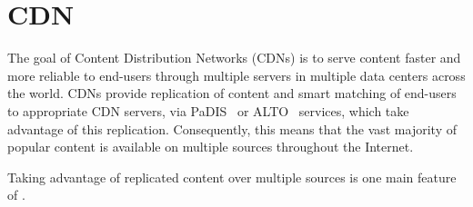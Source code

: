 \section{CDN}
\label{sec:background-cdn}

The goal of Content Distribution Networks (CDNs) is to serve content faster and more reliable to end-users through multiple servers in multiple data centers across the world. 
CDNs provide replication of content and smart matching of end-users to appropriate CDN servers, \eg via PaDIS~\cite{POESE10-ICD} or ALTO~\cite{RFC-ALTO} services, which take advantage of this replication. 
Consequently, this means that the vast majority of popular content is available on multiple sources throughout the Internet. 

Taking advantage of replicated content over multiple sources is one main feature of \mhttp.
